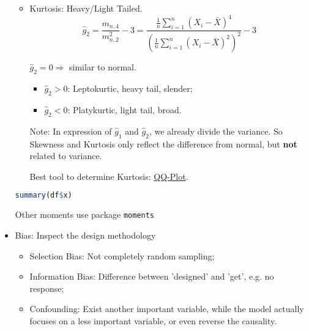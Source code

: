 \begin{itemize}[topsep=2pt,itemsep=2pt]
\begin{itemize}[topsep=2pt,itemsep=2pt]
            \item Kurtosis: Heavy/Light Tailed.
            \begin{equation}
                \hat{g}_2=\dfrac{m_{n,4}}{m_{n,2}^2}-3= \dfrac{\frac{1}{n}\sum\limits_{i=1}^n(X_i-\bar{X})^4}{\left( \frac{1}{n}\sum\limits_{i=1}^n(X_i-\bar{X})^2 \right)^{2}} -3
            \end{equation}

            $ \hat{g}_2=0 \Rightarrow $ similar to normal.
            \begin{itemize}[topsep=2pt,itemsep=2pt]
                \item $ \hat{g}_2>0 $: Leptokurtic, heavy tail, slender;
                \item $ \hat{g}_2<0 $: Platykurtic, light tail, broad.
            \end{itemize}
            
            Note: In expression of $ \hat{g}_1 $ and $ \hat{g}_2 $, we already divide the variance. So Skewness and Kurtosis only reflect the difference from normal, but \textbf{not}  related to variance.
                
            Best tool to determine Kurtosis: \hyperlink{QQplot}{QQ-Plot}.
            
        \end{itemize}

\begin{rcode}
\begin{lstlisting}[language=R]
summary(df$x)
\end{lstlisting}

    Other moments use package \lstinline|moments|
\end{rcode}
        
    
        \item Bias: Inspect the design methodology
        \begin{itemize}[topsep=2pt,itemsep=2pt]
            \item Selection Bias: Not completely random sampling;
            \item Information Bias: Difference between 'designed' and 'get', e.g. no response;
            \item Confounding: Exist another important variable, while the model actually focuses on a less important variable, or even reverse the causality.
        \end{itemize}
        
            
\end{itemize}
    
